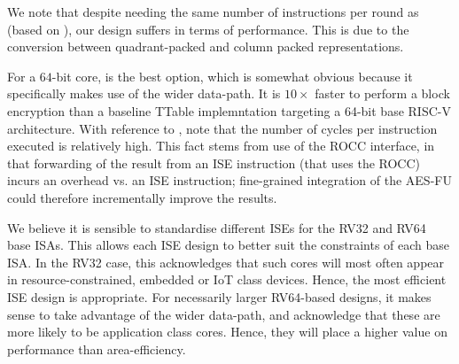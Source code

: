 We note that despite needing the same number of instructions per round
as  (based on \cite{TilGroSze:05}), our  design suffers in terms
of performance.
This is due to the conversion between quadrant-packed and column packed
representations.

For a $64$-bit core,
is the best option, which is somewhat obvious because it specifically makes
use of the wider data-path.
It is $10\times$ faster to perform a block encryption than a baseline TTable
implemntation targeting a 64-bit base RISC-V architecture.
With reference to
, 
note that the number of cycles per instruction executed is relatively high.
This fact stems from use of the ROCC interface, in that forwarding of the 
result from an ISE instruction (that uses the ROCC) incurs an overhead vs. 
an ISE instruction; fine-grained integration of the AES-FU could therefore
incrementally improve the results.

We believe it is sensible to standardise different ISEs for the
RV32 and RV64 base ISAs.
This allows each ISE design to better suit the constraints of each
base ISA.
In the RV32 case, this acknowledges that such cores will most often
appear in resource-constrained, embedded or IoT class devices.
Hence, the most efficient ISE design is appropriate.
For necessarily larger RV64-based designs, it makes sense to take advantage
of the wider data-path, and acknowledge that these are more likely to
be application class cores. Hence, they will place a higher value
on performance than area-efficiency.


